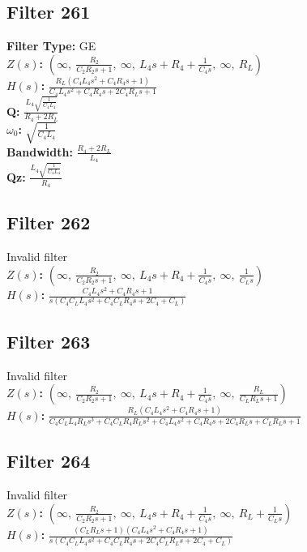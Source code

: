 \documentclass{article}
\begin{document}
\subsection*{Filter 261}
\textbf{Filter Type:} GE \\ 
\textbf{$Z(s)$:} $\left( \infty, \  \frac{R_{2}}{C_{2} R_{2} s + 1}, \  \infty, \  L_{4} s + R_{4} + \frac{1}{C_{4} s}, \  \infty, \  R_{L}\right)$ \\ 
\textbf{$H(s)$:} $\frac{R_{L} \left(C_{4} L_{4} s^{2} + C_{4} R_{4} s + 1\right)}{C_{4} L_{4} s^{2} + C_{4} R_{4} s + 2 C_{4} R_{L} s + 1}$ \\ 
\textbf{Q:} $\frac{L_{4} \sqrt{\frac{1}{C_{4} L_{4}}}}{R_{4} + 2 R_{L}}$ \\ 
\textbf{$\omega_0$:} $\sqrt{\frac{1}{C_{4} L_{4}}}$ \\ 
\textbf{Bandwidth:} $\frac{R_{4} + 2 R_{L}}{L_{4}}$ \\ 
\textbf{Qz:} $\frac{L_{4} \sqrt{\frac{1}{C_{4} L_{4}}}}{R_{4}}$ \\ 
\subsection*{Filter 262}
Invalid filter \\ 
\textbf{$Z(s)$:} $\left( \infty, \  \frac{R_{2}}{C_{2} R_{2} s + 1}, \  \infty, \  L_{4} s + R_{4} + \frac{1}{C_{4} s}, \  \infty, \  \frac{1}{C_{L} s}\right)$ \\ 
\textbf{$H(s)$:} $\frac{C_{4} L_{4} s^{2} + C_{4} R_{4} s + 1}{s \left(C_{4} C_{L} L_{4} s^{2} + C_{4} C_{L} R_{4} s + 2 C_{4} + C_{L}\right)}$ \\ 
\subsection*{Filter 263}
Invalid filter \\ 
\textbf{$Z(s)$:} $\left( \infty, \  \frac{R_{2}}{C_{2} R_{2} s + 1}, \  \infty, \  L_{4} s + R_{4} + \frac{1}{C_{4} s}, \  \infty, \  \frac{R_{L}}{C_{L} R_{L} s + 1}\right)$ \\ 
\textbf{$H(s)$:} $\frac{R_{L} \left(C_{4} L_{4} s^{2} + C_{4} R_{4} s + 1\right)}{C_{4} C_{L} L_{4} R_{L} s^{3} + C_{4} C_{L} R_{4} R_{L} s^{2} + C_{4} L_{4} s^{2} + C_{4} R_{4} s + 2 C_{4} R_{L} s + C_{L} R_{L} s + 1}$ \\ 
\subsection*{Filter 264}
Invalid filter \\ 
\textbf{$Z(s)$:} $\left( \infty, \  \frac{R_{2}}{C_{2} R_{2} s + 1}, \  \infty, \  L_{4} s + R_{4} + \frac{1}{C_{4} s}, \  \infty, \  R_{L} + \frac{1}{C_{L} s}\right)$ \\ 
\textbf{$H(s)$:} $\frac{\left(C_{L} R_{L} s + 1\right) \left(C_{4} L_{4} s^{2} + C_{4} R_{4} s + 1\right)}{s \left(C_{4} C_{L} L_{4} s^{2} + C_{4} C_{L} R_{4} s + 2 C_{4} C_{L} R_{L} s + 2 C_{4} + C_{L}\right)}$ \\ 
\end{document}
